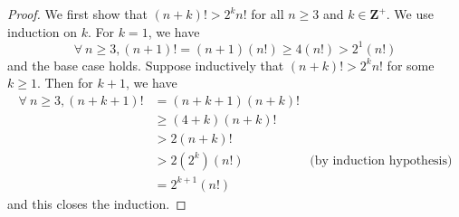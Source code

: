 \begin{proof}
    We first show that \((n + k)! > 2^k n!\) for all \(n \geq 3\) and \(k \in \mathbf{Z}^+\).
    We use induction on \(k\).
    For \(k = 1\), we have
    \[
        \forall\ n \geq 3, (n + 1)! = (n + 1) (n!) \geq 4 (n!) > 2^1 (n!)
    \]
    and the base case holds.
    Suppose inductively that \((n + k)! > 2^k n!\) for some \(k \geq 1\).
    Then for \(k + 1\), we have
    \begin{align*}
        \forall\ n \geq 3, (n + k + 1)! & = (n + k + 1) (n + k)!                                    \\
                                        & \geq (4 + k)(n + k)!                                      \\
                                        & > 2 (n + k)!                                              \\
                                        & > 2 (2^k) (n!)         & \text{(by induction hypothesis)} \\
                                        & = 2^{k + 1} (n!)
    \end{align*}
    and this closes the induction.


\end{proof}
